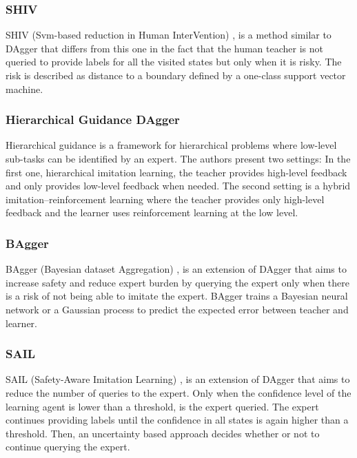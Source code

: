 \subsubsection*{SHIV}
SHIV (Svm-based reduction in Human InterVention) \cite{SHIV-Laskey:2016},  is a method similar to DAgger \cite{DAgger-Ross:2011} that differs from this one in the fact that the human teacher is not queried to provide labels for all the visited states but only when it is risky. The risk is described as distance to a boundary defined by a one-class support vector machine.

\subsubsection*{Hierarchical Guidance DAgger}
Hierarchical guidance \cite{Hierarchical-guidance-Le:2018} is a framework for hierarchical problems where low-level sub-tasks can be identified by an expert. The authors present two settings: In the first one, hierarchical imitation learning,  the teacher provides high-level feedback and only provides low-level feedback when needed. The second setting is a hybrid imitation–reinforcement learning where the teacher provides only high-level feedback and the learner uses reinforcement learning at the low level.



\subsubsection*{BAgger}
BAgger (Bayesian  dataset  Aggregation) \cite{BAgger-Cronrath:2018}, is an extension of DAgger \cite{DAgger-Ross:2011} that aims to increase safety and reduce expert burden by querying the expert only when there is a risk of not being able to imitate the expert. BAgger trains a Bayesian neural network or a Gaussian process to predict the expected error between teacher and learner.


















\subsubsection*{SAIL}
SAIL (Safety-Aware Imitation Learning) \cite{SAIL-Xiong:2019}, is an extension of DAgger that aims to reduce the number of queries to the expert. Only when the confidence level of the learning agent is lower than a threshold, is the expert queried. The expert continues providing labels until the confidence in all states is again higher than a threshold. Then, an uncertainty based approach decides whether or not to continue querying the expert.

